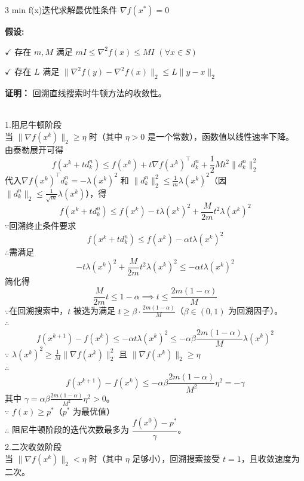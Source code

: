 \documentclass{article}
\newenvironment{problem_cn}[2][问题]{\begin{trivlist}
\item[\hskip \labelsep {\bfseries #1}\hskip \labelsep {\bfseries #2.}]}{\end{trivlist}}
\newenvironment{solution_cn}{%
  \begin{proof}[解答]%
  \kaishu  %
}{%
  \end{proof}%
}
\begin{document}
\vspace{0.25in}
\begin{problem_cn}{3}
min f(x)迭代求解最优性条件 $\nabla f(x^*) = 0$

\textbf{假设:}

$\checkmark$ 存在 $m, M$ 满足 $mI \leq \nabla^2 f(x) \leq MI$ $\left( \forall x \in S \right)$  

$\checkmark$ 存在 $L$ 满足 $\big\|\nabla^2 f(y) - \nabla^2 f(x)\big\|_2 \leq L\|y - x\|_2$  

\textbf{证明：} 回溯直线搜索时牛顿方法的收敛性。
\end{problem_cn}
\begin{solution_cn}
\quad \\
1.阻尼牛顿阶段\\
当 $\|\nabla f({x}^k)\|_2 \geq \eta$ 时（其中 $\eta > 0$ 是一个常数），函数值以线性速率下降。\\  
由泰勒展开可得
$$
f({x}^k + t {d}_k^n) \leq f({x}^k) + t \nabla f({x}^k)^\top {d}_k^n + \frac{1}{2} M t^2 \|{d}_k^n\|_2^2
$$
代入$\nabla f({x}^k)^\top {d}_k^n = -\lambda({x}^k)^2$ 和 $\|{d}_k^n\|_2^2 \leq \frac{1}{m} \lambda({x}^k)^2$（因 $\|{d}_k^n\|_2 \leq \frac{1}{\sqrt{m}} \lambda({x}^k)$），得
$$
f({x}^k + t {d}_k^n) \leq f({x}^k) - t \lambda({x}^k)^2 + \frac{M}{2m} t^2 \lambda({x}^k)^2
$$  
$\because$回溯终止条件要求
$$
f({x}^k + t {d}_k^n) \leq f({x}^k) - \alpha t \lambda({x}^k)^2
$$  
$\therefore$需满足
$$
-t \lambda({x}^k)^2 + \frac{M}{2m} t^2 \lambda({x}^k)^2 \leq -\alpha t \lambda({x}^k)^2
$$  
简化得  
$$
\frac{M}{2m} t \leq 1 - \alpha \implies t \leq \frac{2m(1 - \alpha)}{M}
$$
$\because$在回溯搜索中，$t$ 被选为满足 $t \geq \beta \cdot \frac{2m(1 - \alpha)}{M}$（$\beta \in (0,1)$ 为回溯因子）。\\
$\therefore$
$$
f({x}^{k+1}) - f({x}^k) \leq -\alpha t \lambda({x}^k)^2 \leq -\alpha \beta \frac{2m(1 - \alpha)}{M} \lambda({x}^k)^2
$$  
$\because$ $\lambda({x}^k)^2 \geq \frac{1}{M} \|\nabla f({x}^k)\|_2^2$ 且 $\|\nabla f({x}^k)\|_2 \geq \eta$\\
$\therefore$
$$
f({x}^{k+1}) - f({x}^k) \leq -\alpha \beta \frac{2m(1 - \alpha)}{M^2} \eta^2 = -\gamma
$$
其中 $\gamma = \alpha \beta \frac{2m(1 - \alpha)}{M^2} \eta^2 > 0$。\\ 
$\because$ $f({x}) \geq p^*$（$p^*$ 为最优值）\\
$\therefore$ 阻尼牛顿阶段的迭代次数最多为 $\dfrac{f({x}^0) - p^*}{\gamma}$。\\
2.二次收敛阶段\\
当 $\|\nabla f({x}^k)\|_2 < \eta$ 时（其中 $\eta$ 足够小），回溯搜索接受 $t=1$，且收敛速度为二次。\\

\end{solution_cn}
\end{document}
